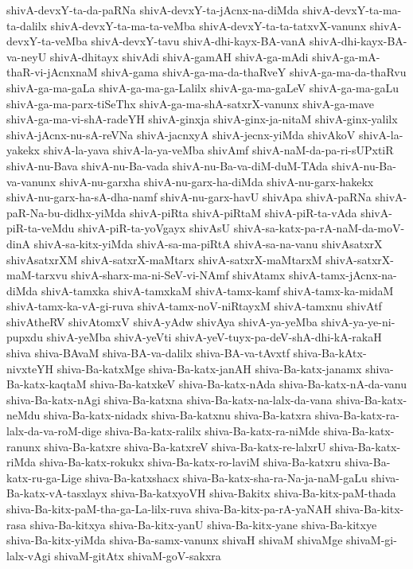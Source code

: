 {shivA-devxY-ta-da-paRNa
shivA-devxY-ta-jAcnx-na-diMda
shivA-devxY-ta-ma-ta-dalilx
shivA-devxY-ta-ma-ta-veMba
shivA-devxY-ta-ta-tatxvX-vanunx
shivA-devxY-ta-veMba
shivA-devxY-tavu
shivA-dhi-kayx-BA-vanA
shivA-dhi-kayx-BA-va-neyU
shivA-dhitayx
shivAdi
shivA-gamAH
shivA-ga-mAdi
shivA-ga-mA-thaR-vi-jAcnxnaM
shivA-gama
shivA-ga-ma-da-thaRveY
shivA-ga-ma-da-thaRvu
shivA-ga-ma-gaLa
shivA-ga-ma-ga-Lalilx
shivA-ga-ma-gaLeV
shivA-ga-ma-gaLu
shivA-ga-ma-parx-tiSeThx
shivA-ga-ma-shA-satxrX-vanunx
shivA-ga-mave
shivA-ga-ma-vi-shA-radeYH
shivA-ginxja
shivA-ginx-ja-nitaM
shivA-ginx-yalilx
shivA-jAcnx-nu-sA-reVNa
shivA-jacnxyA
shivA-jecnx-yiMda
shivAkoV
shivA-la-yakekx
shivA-la-yava
shivA-la-ya-veMba
shivAmf
shivA-naM-da-pa-ri-sUPxtiR
shivA-nu-Bava
shivA-nu-Ba-vada
shivA-nu-Ba-va-diM-duM-TAda
shivA-nu-Ba-va-vanunx
shivA-nu-garxha
shivA-nu-garx-ha-diMda
shivA-nu-garx-hakekx
shivA-nu-garx-ha-sA-dha-namf
shivA-nu-garx-havU
shivApa
shivA-paRNa
shivA-paR-Na-bu-didhx-yiMda
shivA-piRta
shivA-piRtaM
shivA-piR-ta-vAda
shivA-piR-ta-veMdu
shivA-piR-ta-yoVgayx
shivAsU
shivA-sa-katx-pa-rA-naM-da-moV-dinA
shivA-sa-kitx-yiMda
shivA-sa-ma-piRtA
shivA-sa-na-vanu
shivAsatxrX
shivAsatxrXM
shivA-satxrX-maMtarx
shivA-satxrX-maMtarxM
shivA-satxrX-maM-tarxvu
shivA-sharx-ma-ni-SeV-vi-NAmf
shivAtamx
shivA-tamx-jAcnx-na-diMda
shivA-tamxka
shivA-tamxkaM
shivA-tamx-kamf
shivA-tamx-ka-midaM
shivA-tamx-ka-vA-gi-ruva
shivA-tamx-noV-niRtayxM
shivA-tamxnu
shivAtf
shivAtheRV
shivAtomxV
shivA-yAdw
shivAya
shivA-ya-yeMba
shivA-ya-ye-ni-pupxdu
shivA-yeMba
shivA-yeVti
shivA-yeV-tuyx-pa-deV-shA-dhi-kA-rakaH
shiva
shiva-BAvaM
shiva-BA-va-dalilx
shiva-BA-va-tAvxtf
shiva-Ba-kAtx-nivxteYH
shiva-Ba-katxMge
shiva-Ba-katx-janAH
shiva-Ba-katx-janamx
shiva-Ba-katx-kaqtaM
shiva-Ba-katxkeV
shiva-Ba-katx-nAda
shiva-Ba-katx-nA-da-vanu
shiva-Ba-katx-nAgi
shiva-Ba-katxna
shiva-Ba-katx-na-lalx-da-vana
shiva-Ba-katx-neMdu
shiva-Ba-katx-nidadx
shiva-Ba-katxnu
shiva-Ba-katxra
shiva-Ba-katx-ra-lalx-da-va-roM-dige
shiva-Ba-katx-ralilx
shiva-Ba-katx-ra-niMde
shiva-Ba-katx-ranunx
shiva-Ba-katxre
shiva-Ba-katxreV
shiva-Ba-katx-re-lalxrU
shiva-Ba-katx-riMda
shiva-Ba-katx-rokukx
shiva-Ba-katx-ro-laviM
shiva-Ba-katxru
shiva-Ba-katx-ru-ga-Lige
shiva-Ba-katxshacx
shiva-Ba-katx-sha-ra-Na-ja-naM-gaLu
shiva-Ba-katx-vA-tasxlayx
shiva-Ba-katxyoVH
shiva-Bakitx
shiva-Ba-kitx-paM-thada
shiva-Ba-kitx-paM-tha-ga-La-lilx-ruva
shiva-Ba-kitx-pa-rA-yaNAH
shiva-Ba-kitx-rasa
shiva-Ba-kitxya
shiva-Ba-kitx-yanU
shiva-Ba-kitx-yane
shiva-Ba-kitxye
shiva-Ba-kitx-yiMda
shiva-Ba-samx-vanunx
shivaH
shivaM
shivaMge
shivaM-gi-lalx-vAgi
shivaM-gitAtx
shivaM-goV-sakxra
}
